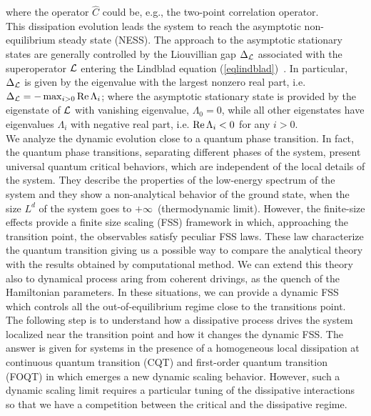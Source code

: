 where the operator $\hat{C}$ could be, e.g., the two-point
correlation operator.\\
This dissipation evolution leads the system to reach the 
asymptotic non-equilibrium steady state (NESS).
The approach to the asymptotic stationary states are generally
controlled by the Liouvillian gap $\Delta_{\cal L}$ associated with
the superoperator ${\cal L}$ entering the Lindblad equation
(\ref{eqlindblad})~\cite{BP-openquantumsystembook,RH-book,Z-2015-relaxtimes,MBBC-18,KS-2020-boundarydephasing}. In particular, $\Delta_{\cal L}$ is given
by the eigenvalue with the largest nonzero real part, i.e. $\Delta_{\cal L} = - \max _{i>0}{\rm Re}\,\Lambda_i$; where the asymptotic stationary state is provided by the eigenstate of
${\cal L}$ with vanishing eigenvalue, $\Lambda_0=0$, while all other
eigenstates have eigenvalues $\Lambda_i$ with negative real part,
i.e. ${\rm Re}\,\Lambda_i<0$ for any $i>0$.\\

We analyze the dynamic evolution close to a quantum phase transition. In fact, the quantum phase transitions, separating different phases of the system, present universal quantum critical behaviors, which are independent of the local details of the system. They describe the properties of the low-energy spectrum of the system and they show a non-analytical behavior of the ground state, when the size $L^d$ of the system goes to $+\infty\,$ (thermodynamic limit). However, the finite-size effects provide a finite size scaling (FSS) framework in which, approaching the transition point, the observables satisfy peculiar FSS laws. These law characterize the quantum transition giving us a possible way to compare the analytical theory with the results obtained by computational method. We can extend this theory also to dynamical process aring from coherent drivings, as the quench of the Hamiltonian parameters. In these situations, we can provide a dynamic FSS which controls all the out-of-equilibrium regime close to the transitions point. The following step is to understand how a dissipative process drives the system localized near the transition point and how it changes the dynamic FSS. The answer is given for systems in the presence of a homogeneous local dissipation at continuous quantum transition (CQT) \cite{NRV-2019-competingdissipativeandcoherent} and first-order quantum transition (FOQT) \cite{di2020dissipative} in which emerges a new dynamic scaling behavior. However, such a dynamic scaling limit requires a particular tuning of the dissipative interactions so that we have a competition between the critical and the dissipative regime. 

